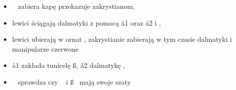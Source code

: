 \begin{itemize}
			\begin{itemize}
				\item \cc~ zabiera kapę przekazuje zakrystianom,
				\item lewici ściągają dalmatyki z pomocą \aa1 oraz \aa2 i \cc,
				\item lewici ubierają w ornat \ii, zakrystianie zabierają w tym czasie dalmatyki i manipularze czerwone
				\item \aa1 zakłada tunicelę \ss, \aa2 dalmatykę \dd,
				\item \cc~ sprawdza czy \dd~ i \ss~ mają swoje szaty
			\end{itemize}
			
		\end{itemize}
	
	\enlargethispage{20pt}
	
